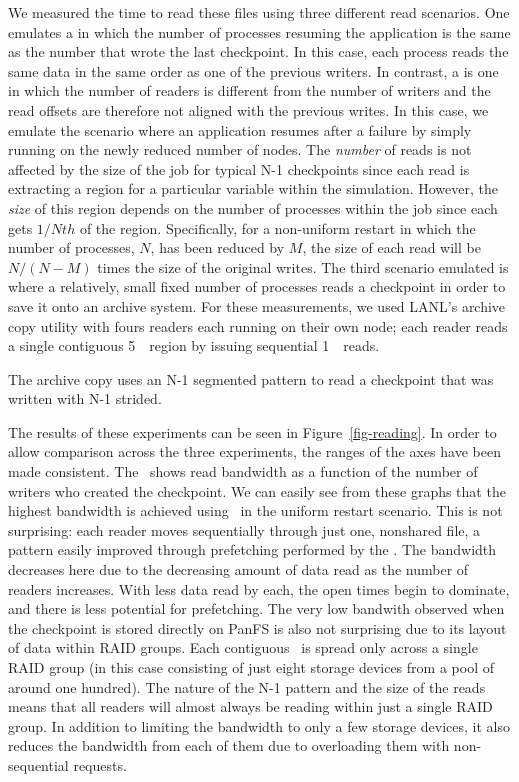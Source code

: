 We measured the time to read these files using three different read scenarios.
One emulates a  in which the number of processes resuming
the application is the same as the number that wrote the last checkpoint. In
this case, each process reads the same data in the same order as one of the
previous writers. In contrast, a  is one in which the
number of readers is different from the number of writers and the read offsets
are therefore not aligned with the previous writes. In this case, we emulate
the scenario where an application resumes after a failure by simply running on
the newly reduced number of nodes. The {\em{number}} of reads is not affected
by the size of the job for typical N-1 checkpoints since each read is
extracting a region for a particular variable within the simulation. However,
the {\em{size}} of this region depends on the number of processes within the
job since each gets $1/Nth$ of the region.  Specifically, for a non-uniform
restart in which the number of processes, $N$, has been reduced by $M$, the
size of each read will be $N/(N-M)$ times the size of the original writes. The
third scenario emulated is where a relatively, small fixed number of processes
reads a checkpoint in order to save it onto an archive system. For these
measurements, we used LANL's archive copy utility with fours readers each
running on their own node; each reader reads a single contiguous 5~\GB\ region
by issuing sequential 1~\MB\ reads. 

The archive copy uses an N-1 segmented pattern to
read a checkpoint that was written with N-1 strided.
\fi

The results of these experiments can be seen in Figure~\ref{fig-reading}. In
order to allow comparison across the three experiments, the ranges of the axes
have been made consistent. The \yaxis\ shows read bandwidth as a function of
the number of writers who created the checkpoint. We can easily see from these
graphs that the highest bandwidth is achieved using \plfs\ in the uniform
restart scenario. This is not surprising: each reader moves sequentially
through just one, nonshared file, a pattern easily improved through prefetching
performed by the \upfs. The bandwidth decreases here due to the decreasing
amount of data read as the number of readers increases. With less data read by
each, the open times begin to dominate, and there is less potential for
prefetching. The very low bandwith observed when the checkpoint is stored
directly on PanFS is also not surprising due to its layout of data within RAID
groups. Each contiguous \GB\ is spread only across a single RAID group (in this
case consisting of just eight storage devices from a pool of around one
hundred). The nature of the N-1 pattern and the size of the reads means that
all readers will almost always be reading within just a single RAID group. In
addition to limiting the bandwidth to only a few storage devices, it also
reduces the bandwidth from each of them due to overloading them with
non-sequential requests.

